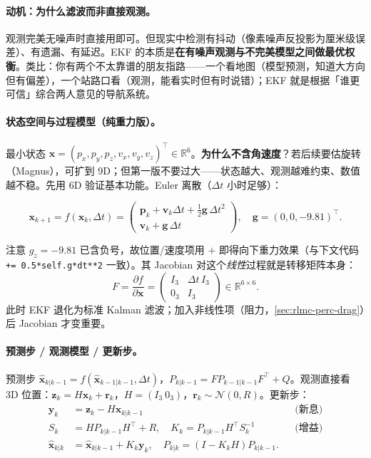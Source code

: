 \paragraph{动机：为什么滤波而非直接观测。}观测完美无噪声时直接用即可。但现实中检测有抖动（像素噪声反投影为厘米级误差）、有遗漏、有延迟。EKF 的本质是\textbf{在有噪声观测与不完美模型之间做最优权衡}。类比：你有两个不太靠谱的朋友指路——一个看地图（模型预测，知道大方向但有偏差），一个站路口看（观测，能看实时但有时说错）；EKF 就是根据「谁更可信」综合两人意见的导航系统。

\paragraph{状态空间与过程模型（纯重力版）。}最小状态 $\mathbf x=(p_x,p_y,p_z,v_x,v_y,v_z)^{\!\top}\in\mathbb R^6$。\textbf{为什么不含角速度}？若后续要估旋转（Magnus），可扩到 9D；但第一版不要过大——状态越大、观测越难约束、数值越不稳。先用 6D 验证基本功能。Euler 离散（$\Delta t$ 小时足够）：

\begin{equation}
\mathbf x_{k+1}=f(\mathbf x_k,\Delta t)=
\begin{pmatrix}
\mathbf p_k+\mathbf v_k\Delta t+\tfrac12\mathbf g\,\Delta t^2\\[2pt]
\mathbf v_k+\mathbf g\,\Delta t
\end{pmatrix},\quad \mathbf g=(0,0,-9.81)^{\!\top}.
\label{eq:rlmc-perc-process}
\end{equation}

注意 $g_z=-9.81$ 已含负号，故位置/速度项用 $+$ 即得向下重力效果（与下文代码 \verb|+= 0.5*self.g*dt**2| 一致）。其 Jacobian 对这个\emph{线性}过程就是转移矩阵本身：
\begin{equation}
F=\frac{\partial f}{\partial\mathbf x}=
\begin{pmatrix} I_3 & \Delta t\,I_3\\ 0_3 & I_3\end{pmatrix}\in\mathbb R^{6\times 6}.
\label{eq:rlmc-perc-jac-gravity}
\end{equation}
此时 EKF 退化为标准 Kalman 滤波；加入非线性项（阻力，\cref{sec:rlmc-perc-drag}）后 Jacobian 才变重要。

\paragraph{预测步 / 观测模型 / 更新步。}预测步 $\hat{\mathbf x}_{k|k-1}=f(\hat{\mathbf x}_{k-1|k-1},\Delta t)$，$P_{k|k-1}=FP_{k-1|k-1}F^{\!\top}+Q$。观测直接看 3D 位置：$\mathbf z_k=H\mathbf x_k+\mathbf r_k$，$H=(I_3\ 0_3)$，$\mathbf r_k\sim\mathcal N(0,R)$。更新步：
\begin{align}
\mathbf y_k&=\mathbf z_k-H\hat{\mathbf x}_{k|k-1} && \text{(新息)}\label{eq:rlmc-perc-innov}\\
S_k&=HP_{k|k-1}H^{\!\top}+R, \quad K_k=P_{k|k-1}H^{\!\top}S_k^{-1} && \text{(增益)}\label{eq:rlmc-perc-gain}\\
\hat{\mathbf x}_{k|k}&=\hat{\mathbf x}_{k|k-1}+K_k\mathbf y_k,\quad P_{k|k}=(I-K_kH)P_{k|k-1}.&&\label{eq:rlmc-perc-update}
\end{align}

